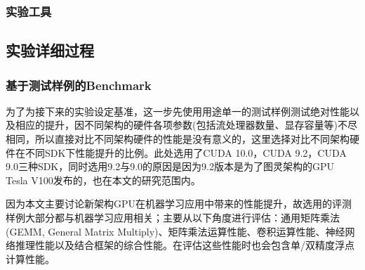 \subsubsection{实验工具}
\subsection{实验详细过程}
\subsubsection{基于测试样例的Benchmark}
\par 为了为接下来的实验设定基准，这一步先使用用途单一的测试样例测试绝对性能以及相应的提升，因不同架构的硬件各项参数(包括流处理器数量、显存容量等)不尽相同，所以直接对比不同架构硬件的性能是没有意义的，这里选择对比不同架构硬件在不同SDK下性能提升的比例。此处选用了CUDA 10.0，CUDA 9.2，CUDA 9.0三种SDK，同时选用9.2与9.0的原因是因为9.2版本是为了图灵架构的GPU Tesla V100发布的\parencite{CUDA92}，也在本文的研究范围内。
\par 因为本文主要讨论新架构GPU在机器学习应用中带来的性能提升，故选用的评测样例大部分都与机器学习应用相关；主要从以下角度进行评估：通用矩阵乘法(GEMM, General Matrix Multiply)、矩阵乘法运算性能、卷积运算性能、神经网络推理性能以及结合框架的综合性能。在评估这些性能时也会包含单/双精度浮点计算性能。

